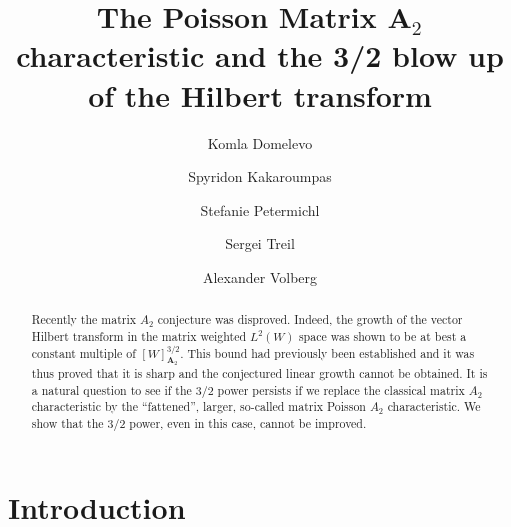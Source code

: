 \documentclass{amsart}
\theoremstyle{definition}
\theoremstyle{remark}
\begin{document}
\title[ Poisson Matrix $\mathbf{A}_2$ characteristic ]{The Poisson Matrix $\mathbf{A}_2$ characteristic and the 3/2 blow up of the Hilbert transform}

\author[Domelevo]{Komla Domelevo}
\address{Institut f{\"u}r Mathematik, Julius-Maximilians-Universit{\"a}t
W{\"u}rzburg, Emil-Fischer-Str.~41, 97074 W{\"u}rzburg, Germany}

\author[Kakaroumpas]{Spyridon Kakaroumpas}
\address{Institut f{\"u}r Mathematik, Julius-Maximilians-Universit{\"a}t
W{\"u}rzburg, Emil-Fischer-Str.~41, 97074 W{\"u}rzburg, Germany}

\author[Petermichl]{Stefanie Petermichl}
\address{Institut f{\"u}r Mathematik, Julius-Maximilians-Universit{\"a}t
W{\"u}rzburg, Emil-Fischer-Str.~41, 97074 W{\"u}rzburg, Germany}

\author[Treil]{Sergei Treil}
\address{Department of Mathematics, Brown University, Box 1917, 151 Thayer Street Providence, RI 02912, USA}

\author[Volberg]{Alexander Volberg}
\address{Department of Mathematics, Michigan State University, 619 Red Cedar Road,
C212 Wells Hall, East Lansing, MI 48824, USA}

\begin{abstract}
    Recently the matrix $A_2$ conjecture was disproved. %
    Indeed, the growth of the vector Hilbert transform in the matrix weighted $L^2(W)$ space was shown to be at best a constant multiple of $[W]_{\mathbf{A}_2}^{3/2}$. This bound had  previously been  established and it was thus proved  that it is sharp and the conjectured linear growth cannot be obtained. It is a natural question to see if the $3/2$ power persists if we replace the classical matrix $A_2$ characteristic by the ``fattened'', larger, so-called matrix Poisson $A_2$ characteristic. We show that the 3/2 power, even in this case, cannot be improved.
\end{abstract}

\maketitle

\section{Introduction}
\end{document}
